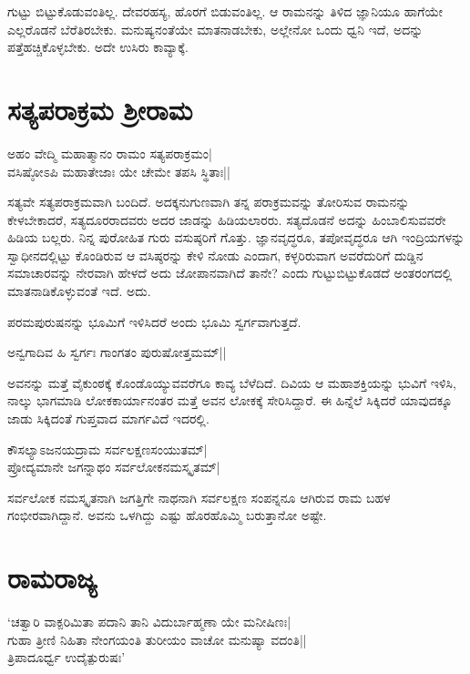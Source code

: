 ಗುಟ್ಟು ಬಿಟ್ಟುಕೊಡುವಂತಿಲ್ಲ. ದೇವರಹಸ್ಯ, ಹೊರಗೆ ಬಿಡುವಂತಿಲ್ಲ. ಆ ರಾಮನನ್ನು ತಿಳಿದ ಜ್ಞಾನಿಯೂ ಹಾಗೆಯೇ ಎಲ್ಲರೊಡನೆ ಬೆರೆತಿರಬೇಕು. ಮನುಷ್ಯನಂತೆಯೇ ಮಾತನಾಡಬೇಕು, ಅಲ್ಲೇನೋ ಒಂದು ಧ್ವನಿ ಇದೆ, ಅದನ್ನು ಪತ್ತೆಹಚ್ಚಿಕೊಳ್ಳಬೇಕು. ಅದೇ ಉಸಿರು ಕಾವ್ಯಾಕ್ಕೆ. 

\section*{ಸತ್ಯಪರಾಕ್ರಮ ಶ್ರೀರಾಮ}

\begin{shloka}
ಅಹಂ ವೇದ್ಮಿ ಮಹಾತ್ಮಾನಂ ರಾಮಂ ಸತ್ಯಪರಾಕ್ರಮಂ|\\
ವಸಿಷ್ಠೋಽಪಿ ಮಹಾತೇಜಾಃ ಯೇ ಚೇಮೇ ತಪಸಿ ಸ್ಥಿತಾಃ||
\end{shloka}

ಸತ್ಯವೇ ಸತ್ಯಪರಾಕ್ರಮವಾಗಿ ಬಂದಿದೆ. ಅದಕ್ಕನುಗುಣವಾಗಿ ತನ್ನ ಪರಾಕ್ರಮವನ್ನು ತೋರಿಸುವ ರಾಮನನ್ನು ಕೇಳಬೇಕಾದರೆ, ಸತ್ಯದೂರರಾದವರು ಅದರ ಜಾಡನ್ನು ಹಿಡಿಯಲಾರರು. ಸತ್ಯದೊಡನೆ ಅದನ್ನು ಹಿಂಬಾಲಿಸುವವರೇ ಹಿಡಿಯ ಬಲ್ಲರು. ನಿನ್ನ ಪುರೋಹಿತ ಗುರು ವಸುಷ್ಠರಿಗೆ ಗೊತ್ತು. ಜ್ಞಾನವೃದ್ಧರೂ, ತಪೋವೃದ್ಧರೂ ಆಗಿ ಇಂದ್ರಿಯಗಳನ್ನು ಸ್ವಾಧೀನದಲ್ಲಿಟ್ಟು ಕೊಂಡಿರುವ ಆ ವಸಿಷ್ಠರನ್ನು ಕೇಳಿ ನೋಡು ಎಂದಾಗ, ಕಳ್ಳರಿರುವಾಗ ಅವರೆದುರಿಗೆ ದುಡ್ಡಿನ ಸಮಾಚಾರವನ್ನು ನೇರವಾಗಿ ಹೇಳದೆ ಅದು ಜೋಪಾನವಾಗಿದೆ ತಾನೇ? ಎಂದು ಗುಟ್ಟುಬಿಟ್ಟುಕೊಡದೆ ಅಂತರಂಗದಲ್ಲಿ ಮಾತನಾಡಿಕೊಳ್ಳುವಂತೆ ಇದೆ. ಅದು. 

ಪರಮಪುರುಷನನ್ನು ಭೂಮಿಗೆ ಇಳಿಸಿದರೆ ಅಂದು ಭೂಮಿ ಸ್ವರ್ಗವಾಗುತ್ತದೆ. 

\begin{shloka}
ಅನ್ವಗಾದಿವ ಹಿ ಸ್ವರ್ಗಃ ಗಾಂಗತಂ ಪುರುಷೋತ್ತಮಮ್||
\end{shloka}

ಅವನನ್ನು ಮತ್ತೆ ವೈಕುಂಠಕ್ಕೆ ಕೊಂಡೊಯ್ಯುವವರೆಗೂ ಕಾವ್ಯ ಬೆಳೆದಿದೆ. ದಿವಿಯ ಆ ಮಹಾಶಕ್ತಿಯನ್ನು ಭುವಿಗೆ ಇಳಿಸಿ, ನಾಲ್ಕು ಭಾಗಮಾಡಿ ಲೋಕಕಾರ್ಯಾನಂತರ ಮತ್ತೆ ಅವನ ಲೋಕಕ್ಕೆ ಸೇರಿಸಿದ್ದಾರೆ. ಈ ಹಿನ್ನೆಲೆ ಸಿಕ್ಕಿದರೆ ಯಾವುದಕ್ಕೂ ಜಾಡು ಸಿಕ್ಕಿದಂತೆ ಗುಪ್ತವಾದ ಮಾರ್ಗವಿದೆ ಇದರಲ್ಲಿ. 

\begin{shloka}
ಕೌಸಲ್ಯಾಽಜನಯದ್ರಾಮ‌ ಸರ್ವಲಕ್ಷಣಸಂಯುತಮ್|\\
ಪ್ರೋದ್ಯಮಾನೇ ಜಗನ್ನಾಥಂ ಸರ್ವಲೋಕನಮಸ್ಕೃತಮ್|
\end{shloka}

ಸರ್ವಲೋಕ ನಮಸ್ಕೃತನಾಗಿ ಜಗತ್ತಿಗೇ ನಾಥನಾಗಿ ಸರ್ವಲಕ್ಷಣ ಸಂಪನ್ನನೂ ಆಗಿರುವ ರಾಮ ಬಹಳ ಗಂಭೀರವಾಗಿದ್ದಾನೆ. ಅವನು ಒಳಗಿದ್ದು ಎಷ್ಟು ಹೊರಹೊಮ್ಮಿ ಬರುತ್ತಾನೋ ಅಷ್ಟೇ. 

\section*{ರಾಮರಾಜ್ಯ}

\begin{shloka}
`ಚತ್ವಾರಿ ವಾಕ್ಪರಿಮಿತಾ ಪದಾನಿ ತಾನಿ ವಿದುರ್ಬಾಹ್ಮಣಾ ಯೇ ಮನೀಷಿಣಃ|\\
ಗುಹಾ ತ್ರೀಣಿ ನಿಹಿತಾ ನೇಂಗಯಂತಿ ತುರೀಯಂ ವಾಚೋ ಮನುಷ್ಯಾ ವದಂತಿ||\\
ತ್ರಿಪಾದೂರ್ಧ್ವ ಉದೈತ್ಪುರುಷಃ'
\end{shloka}

